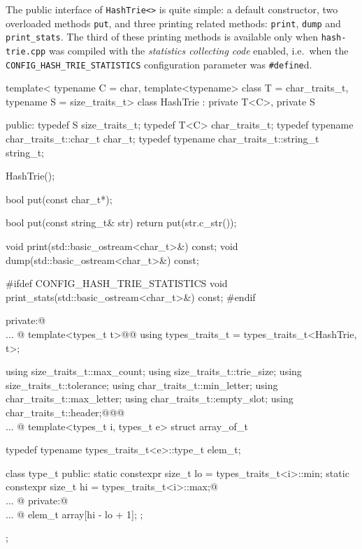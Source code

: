 \documentclass[a4paper,11pt]{article}
\makeatletter
\renewcommand{\=}{\protect\nobreakdash-\hspace{0pt}}
\renewcommand{\~}{\protect\nobreakdash--\hspace{0pt}}
\newcommand{\ie}{i.e.}
\newcommand{\code}[1]{{\tt{#1}}}
\newcommand\code*[1]{\mbox{\code{#1}}}
\let\lst@ifskiplines\iffalse
\newcommand\skipnumbering[1]{%
	\setcounter{lstnumber}{\numexpr#1-1\relax}%
	\let\lst@ifskiplines\iftrue
	\\\lst@PlaceNumber
	\let\lst@ifskiplines\iffalse
	\lst@ifshowskiplines...\fi
}
\let\lst@PlaceNumber\@empty
\newcommand{\define}{\code{{\#}define}}%
\makeatother
\begin{document}
The public interface of \code{HashTrie<>} is quite simple: a default constructor,
two overloaded methods \code{put}, and three printing related methods:
\code{print},
\code{dump} and
\code{print\_stats}.
The third of these printing methods is available only when \code{hash-trie.cpp}
was compiled with the \emph{statistics collecting code} enabled, \ie\ when the
\code{CONFIG\_HASH\_TRIE\_STATISTICS} configuration parameter was
\define d.
%
%
\begin{hashtrielisting}[1983]
template<
	typename C = char,
	template<typename> class T = char_traits_t,
	typename S = size_traits_t>
class HashTrie :
	private T<C>,
	private S
{
public:
	typedef S size_traits_t;
	typedef T<C> char_traits_t;
	typedef typename char_traits_t::char_t char_t;
	typedef typename char_traits_t::string_t string_t;

	HashTrie();

	bool put(const char_t*);

	bool put(const string_t& str)
	{ return put(str.c_str()); }

	void print(std::basic_ostream<char_t>&) const;
	void dump(std::basic_ostream<char_t>&) const;

#ifdef CONFIG_HASH_TRIE_STATISTICS
	void print_stats(std::basic_ostream<char_t>&) const;
#endif

private:@\skipnumbering{2015}@
	template<types_t t>@\label{cpp-inner-types-traits-begin}@
	using types_traits_t = types_traits_t<HashTrie, t>;

	using size_traits_t::max_count;
	using size_traits_t::trie_size;
	using size_traits_t::tolerance;
	using char_traits_t::min_letter;
	using char_traits_t::max_letter;
	using char_traits_t::empty_slot;
	using char_traits_t::header;@\label{cpp-inner-types-traits-end}@@\skipnumbering{2083}@
	template<types_t i, types_t e>
	struct array_of_t
	{
		typedef
			typename types_traits_t<e>::type_t
			elem_t;

		class type_t
		{
		public:
			static constexpr size_t lo =
				types_traits_t<i>::min;
			static constexpr size_t hi =
				types_traits_t<i>::max;@\skipnumbering{2177}@
		private:@\skipnumbering{2183}@
			elem_t array[hi - lo + 1];
		};
	};

}
\end{hashtrielisting}
\end{document}
